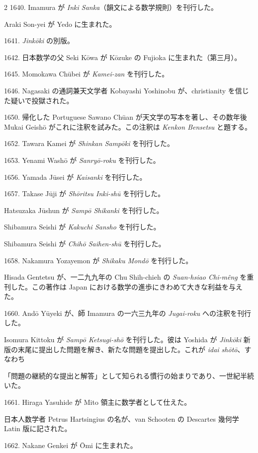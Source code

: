 \documentclass[11pt]{article}
\newcommand{\scanpage}[2]{\clearpage\setcounter{footnote}{0}\noindent{\footnotesize\color{gray}PDF #1 頁 · #2}\par\medskip}
\begin{document}
\scanpage{0194}{第23章年表、印刷頁180}
\begin{multicols}{2}\small
1640. Imamura が \emph{Inki Sanka}（韻文による数学規則）を刊行した。

Araki Son-yei が Yedo に生まれた。

1641. \emph{Jinkōki} の別版。

1642. 日本数学の父 Seki Kōwa が Kōzuke の Fujioka に生まれた（第三月）。

1645. Momokawa Chūbei が \emph{Kamei-zan} を刊行した。

1646. Nagasaki の通詞兼天文学者 Kobayashi Yoshinobu が、christianity を信じた疑いで投獄された。

1650. 帰化した Portuguese Sawano Chūan が天文学の写本を著し、その数年後 Mukai Geishō がこれに注釈を試みた。この注釈は \emph{Kenkon Bensetsu} と題する。

1652. Tawara Kamei が \emph{Shinkan Sampōki} を刊行した。

1653. Yenami Washō が \emph{Sanryō-roku} を刊行した。

1656. Yamada Jūsei が \emph{Kaisanki} を刊行した。

1657. Takase Jūji が \emph{Shōritsu Inki-shū} を刊行した。

Hatsuzaka Jūshun が \emph{Sampō Shikanki} を刊行した。

Shibamura Seishi が \emph{Kakuchi Sansho} を刊行した。

Shibamura Seishi が \emph{Chihō Saihen-shū} を刊行した。

1658. Nakamura Yozayemon が \emph{Shikaku Mondō} を刊行した。

Hisada Gentetsu が、一二九九年の Chu Shih-chieh の \emph{Suan-hsiao Chi-mêng} を重刊した。この著作は Japan における数学の進歩にきわめて大きな利益を与えた。

1660. Andō Yūyeki が、師 Imamura の一六三九年の \emph{Jugai-roku} への注釈を刊行した。

Isomura Kittoku が \emph{Sampō Ketsugi-shō} を刊行した。彼は Yoshida が \emph{Jinkōki} 新版の末尾に提出した問題を解き、新たな問題を提出した。これが \emph{idai shōtō}、すなわち

\columnbreak
「問題の継続的な提出と解答」として知られる慣行の始まりであり、一世紀半続いた。

1661. Hiraga Yasuhide が Mito 領主に数学者として仕えた。

日本人数学者 Petrus Hartsingius の名が、van Schooten の Descartes 幾何学 Latin 版に記された。

1662. Nakane Genkei が Ōmi に生まれた。


\end{multicols}
\end{document}
